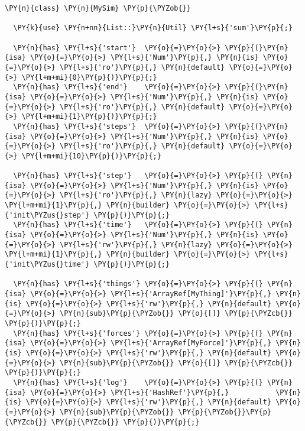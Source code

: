 \begin{Verbatim}[commandchars=\\\{\}]
\PY{n}{class} \PY{n}{MySim} \PY{p}{\PYZob{}}

  \PY{k}{use} \PY{n+nn}{List::}\PY{n}{Util} \PY{l+s}{'sum'}\PY{p}{;}

  \PY{n}{has} \PY{l+s}{'start'}  \PY{o}{=}\PY{o}{>} \PY{p}{(}\PY{n}{isa} \PY{o}{=}\PY{o}{>} \PY{l+s}{'Num'}\PY{p}{,} \PY{n}{is} \PY{o}{=}\PY{o}{>} \PY{l+s}{'ro'}\PY{p}{,} \PY{n}{default} \PY{o}{=}\PY{o}{>} \PY{l+m+mi}{0}\PY{p}{)}\PY{p}{;}
  \PY{n}{has} \PY{l+s}{'end'}    \PY{o}{=}\PY{o}{>} \PY{p}{(}\PY{n}{isa} \PY{o}{=}\PY{o}{>} \PY{l+s}{'Num'}\PY{p}{,} \PY{n}{is} \PY{o}{=}\PY{o}{>} \PY{l+s}{'ro'}\PY{p}{,} \PY{n}{default} \PY{o}{=}\PY{o}{>} \PY{l+m+mi}{1}\PY{p}{)}\PY{p}{;}
  \PY{n}{has} \PY{l+s}{'steps'}  \PY{o}{=}\PY{o}{>} \PY{p}{(}\PY{n}{isa} \PY{o}{=}\PY{o}{>} \PY{l+s}{'Num'}\PY{p}{,} \PY{n}{is} \PY{o}{=}\PY{o}{>} \PY{l+s}{'ro'}\PY{p}{,} \PY{n}{default} \PY{o}{=}\PY{o}{>} \PY{l+m+mi}{10}\PY{p}{)}\PY{p}{;}

  \PY{n}{has} \PY{l+s}{'step'}   \PY{o}{=}\PY{o}{>} \PY{p}{(} \PY{n}{isa} \PY{o}{=}\PY{o}{>} \PY{l+s}{'Num'}\PY{p}{,} \PY{n}{is} \PY{o}{=}\PY{o}{>} \PY{l+s}{'ro'}\PY{p}{,} \PY{n}{lazy} \PY{o}{=}\PY{o}{>} \PY{l+m+mi}{1}\PY{p}{,} \PY{n}{builder} \PY{o}{=}\PY{o}{>} \PY{l+s}{'init\PYZus{}step'} \PY{p}{)}\PY{p}{;}
  \PY{n}{has} \PY{l+s}{'time'}   \PY{o}{=}\PY{o}{>} \PY{p}{(} \PY{n}{isa} \PY{o}{=}\PY{o}{>} \PY{l+s}{'Num'}\PY{p}{,} \PY{n}{is} \PY{o}{=}\PY{o}{>} \PY{l+s}{'rw'}\PY{p}{,} \PY{n}{lazy} \PY{o}{=}\PY{o}{>} \PY{l+m+mi}{1}\PY{p}{,} \PY{n}{builder} \PY{o}{=}\PY{o}{>} \PY{l+s}{'init\PYZus{}time'} \PY{p}{)}\PY{p}{;}

  \PY{n}{has} \PY{l+s}{'things'} \PY{o}{=}\PY{o}{>} \PY{p}{(} \PY{n}{isa} \PY{o}{=}\PY{o}{>} \PY{l+s}{'ArrayRef[MyThing]'}\PY{p}{,} \PY{n}{is} \PY{o}{=}\PY{o}{>} \PY{l+s}{'rw'}\PY{p}{,} \PY{n}{default} \PY{o}{=}\PY{o}{>} \PY{n}{sub}\PY{p}{\PYZob{}} \PY{o}{[]} \PY{p}{\PYZcb{}} \PY{p}{)}\PY{p}{;}
  \PY{n}{has} \PY{l+s}{'forces'} \PY{o}{=}\PY{o}{>} \PY{p}{(} \PY{n}{isa} \PY{o}{=}\PY{o}{>} \PY{l+s}{'ArrayRef[MyForce]'}\PY{p}{,} \PY{n}{is} \PY{o}{=}\PY{o}{>} \PY{l+s}{'rw'}\PY{p}{,} \PY{n}{default} \PY{o}{=}\PY{o}{>} \PY{n}{sub}\PY{p}{\PYZob{}} \PY{o}{[]} \PY{p}{\PYZcb{}} \PY{p}{)}\PY{p}{;}
  \PY{n}{has} \PY{l+s}{'log'}    \PY{o}{=}\PY{o}{>} \PY{p}{(} \PY{n}{isa} \PY{o}{=}\PY{o}{>} \PY{l+s}{'HashRef'}\PY{p}{,}           \PY{n}{is} \PY{o}{=}\PY{o}{>} \PY{l+s}{'rw'}\PY{p}{,} \PY{n}{default} \PY{o}{=}\PY{o}{>} \PY{n}{sub}\PY{p}{\PYZob{}} \PY{p}{\PYZob{}}\PY{p}{\PYZcb{}} \PY{p}{\PYZcb{}} \PY{p}{)}\PY{p}{;}
\end{Verbatim}
